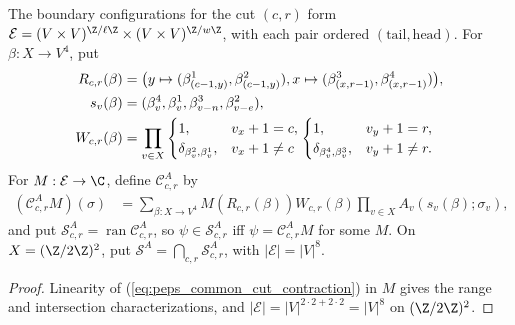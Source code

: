\begin{definition}%
    \label{def:peps_four_cut_common_boundary}
    \leanok
    The boundary configurations for the cut $(c,r)$ form
    $\mathcal E=(V\times V)^{\Z/\ell\Z}\times(V\times V)^{\Z/w\Z}$, with each
    pair ordered $(\text{tail},\text{head})$. For $\beta:X\to V^4$, put
    \begin{align}
        R_{c,r}(\beta)
                   & =\bigl(y\mapsto(\beta^1_{(c-1,y)},\beta^2_{(c-1,y)}),
        x\mapsto(\beta^3_{(x,r-1)},\beta^4_{(x,r-1)})\bigr),
        \label{eq:peps_common_boundary_restriction}                        \\
        s_v(\beta) & =(\beta_v^4,\beta_v^1,\beta_{v-n}^3,\beta_{v-e}^2),
        \notag                                                             \\
        W_{c,r}(\beta)
                   & =\prod_{v\in X}
        \begin{cases}1,&v_x+1=c,\\\delta_{\beta_v^2,\beta_v^1},&v_x+1\ne c\end{cases}
        \begin{cases}1,&v_y+1=r,\\\delta_{\beta_v^4,\beta_v^3},&v_y+1\ne r.\end{cases}
        \notag
    \end{align}
    For $M:\mathcal E\to\C$, define $\mathcal C^A_{c,r}$ by
    \begin{align}
        (\mathcal C^A_{c,r}M)(\sigma)
         & =\sum_{\beta:X\to V^4}M(R_{c,r}(\beta))W_{c,r}(\beta)
        \prod_{v\in X}A_v(s_v(\beta);\sigma_v),
        \label{eq:peps_common_cut_contraction}
    \end{align}
    and put $\mathcal S^A_{c,r}=\operatorname{ran}\mathcal C^A_{c,r}$, so
    $\psi\in\mathcal S^A_{c,r}$ iff $\psi=\mathcal C^A_{c,r}M$ for some $M$.
    On $X=(\Z/2\Z)^2$, put $\mathcal S^A=\bigcap_{c,r}\mathcal S^A_{c,r}$, with
    $|\mathcal E|=|V|^8$.
\end{definition}
\begin{proof}\leanok
    Linearity of (\ref{eq:peps_common_cut_contraction}) in $M$ gives the range
    and intersection characterizations, and $|\mathcal E|=|V|^{2\cdot2+2\cdot2}=|V|^8$
    on $(\Z/2\Z)^2$.
\end{proof}


